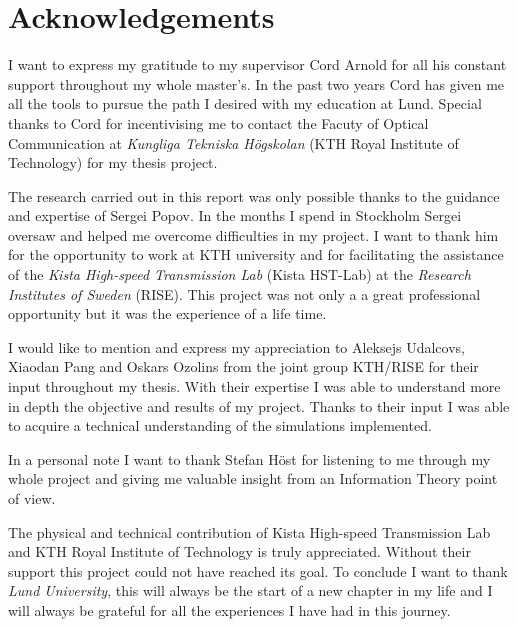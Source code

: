 \chapter*{Acknowledgements}

I want to express my gratitude to my supervisor Cord Arnold for all his constant support throughout my whole master's. In the past two years Cord has given me all the tools to pursue the path I desired with my education at Lund. Special thanks to Cord for incentivising me to contact the Facuty of Optical Communication at \textit{Kungliga Tekniska Högskolan} (KTH Royal Institute of Technology) for my thesis project.	  

The research carried out in this report was only possible thanks to the guidance and expertise of Sergei Popov. In the months I spend in Stockholm Sergei oversaw and helped me overcome difficulties in my project. I want to thank him for the opportunity to work at KTH university and for facilitating the assistance of the \textit{ Kista High-speed Transmission Lab} (Kista HST-Lab) at the \textit{Research Institutes of Sweden} (RISE).	 This project was not only a a great professional opportunity but it was the experience of a life time.

I would like to mention and express my appreciation to Aleksejs Udalcovs, Xiaodan Pang and Oskars Ozolins from the joint group KTH/RISE for their input throughout my thesis. With their expertise I was able to understand more in depth the objective and results of my project. Thanks to their input I was able to acquire a technical understanding of the simulations implemented.

In a personal note I want to thank Stefan Höst for listening to me through my whole project and giving me valuable insight from an Information Theory point of view.   

The physical and technical contribution of Kista High-speed Transmission Lab and KTH Royal Institute of Technology  is truly appreciated. Without their support  this project could not have reached its goal. To conclude I want to thank \textit{Lund University}, this will always be the start of a new chapter in my life and I will always be grateful for all the experiences I have  had in this journey. ~\\


